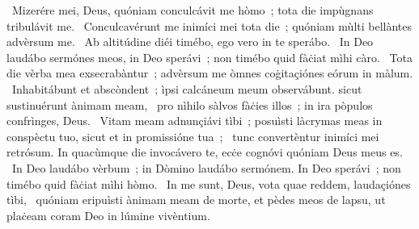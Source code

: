 \psalmChapterWithInscription{}
{ }
{%
~Mizerére mei, Deus, quóniam conculcávit me hòmo~; tota die impùgnans tribulávit me. 
~Conculcavérunt me inimíci mei tota die~; quóniam mùlti bellàntes advèrsum me. 
~Ab altitúdine diéi timébo, ego vero in te sperábo. 
~In Deo laudábo sermónes meos, in Deo sperávi~; non timébo quid fàċiat mìhi càro. 
~Tota die vèrba mea exsecrabàntur~; advèrsum me òmnes coġitaçiónes eórum in màlum. 
~Inhabitábunt et abscòndent~; ìpsi calcáneum meum observábunt. sicut sustinuérunt ànimam meam, 
~pro nìhilo sàlvos fàċies illos~; in ira pòpulos confrìnges, Deus. 
~Vitam meam adnunçiávi tìbi~; posuìsti làcrymas meas in conspèctu tuo, sicut et in promissióne tua~; 
~tunc convertèntur inimíci mei retrósum. In quacùmque die invocávero te, ecċe cognóvi quóniam Deus meus es. 
~In Deo laudábo vèrbum~; in Dòmino laudábo sermónem. In Deo sperávi~; non timébo quid fàċiat mìhi hòmo. 
~In me sunt, Deus, vota quae reddem, laudaçiónes tìbi, 
~quóniam eripuìsti ànimam meam de morte, et pèdes meos de lapsu, ut plaċeam coram Deo in lúmine vivèntium. 
}
